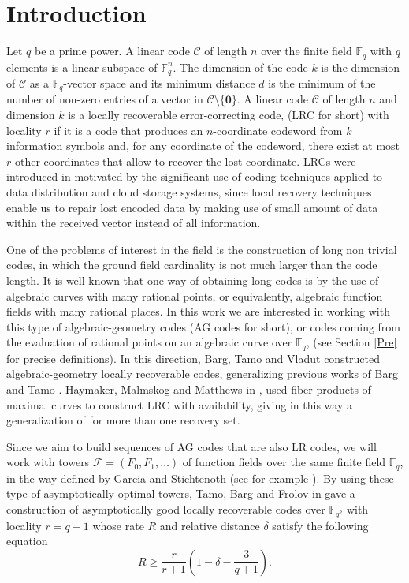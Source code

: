 \documentclass{amsart}
\newcommand{\m}{\mathcal}
\newcommand{\F}{\mathbb{F}}
\theoremstyle{definition}
\begin{document}
\section{Introduction}

 Let $q$ be a prime power.  A linear code $\m{C}$ of length $n$ over the finite field  $\F_q$ with $q$ elements is a linear subspace of $\F_q^n$. The dimension of the code $k$ is the dimension of $\m{C}$ as a $\F_q$-vector space and its minimum distance $d$ is the minimum of the number of non-zero entries of a vector in $\m{C}\setminus\{\mathbf 0\}$. A linear code $\m{C}$ of length $n$ and dimension $k$  is a locally recoverable error-correcting code, (LRC for short) with locality $r$ if it is a code that produces an $n$-coordinate codeword from $k$ information symbols and, for any coordinate of the codeword, there exist at most $r$ other coordinates that allow to recover the lost coordinate. LRCs were introduced in \cite{GHSY12} motivated by the significant use of coding techniques applied to data distribution and cloud storage systems, since local recovery techniques enable us to repair lost encoded data by making use of small amount of data within the received vector instead of all information. 

One of the problems of interest in the field is the construction of long non trivial codes, in which the ground field cardinality is not much larger than the code length. It is well known that one way of obtaining long codes is by the use of algebraic curves with many rational points, or equivalently, algebraic function fields with many rational places. In this work we are interested in working with this type of algebraic-geometry codes (AG codes for short), or codes coming from the evaluation of rational points on an algebraic curve over $\F_q$, (see Section \ref{Pre} for precise definitions).  In this direction, Barg, Tamo and Vladut \cite{BargTamoVladut} constructed algebraic-geometry locally recoverable codes, generalizing previous works of Barg and Tamo \cite{TamoBarg, TamoBargOptimal}. Haymaker, Malmskog and Matthews in \cite{HMM}, used fiber products of maximal curves to construct LRC with availability, giving in this way a generalization of \cite{BargTamoVladut} for more than one recovery set. 

Since we aim to build sequences of AG codes that are also LR codes, we will work with towers $\m{F}=(F_0, F_1, \ldots)$ of function fields over the same finite field $\F_q$, in the way defined by Garcia and Stichtenoth (see for example \cite{GS, stichtenoth}). 
By using these type of asymptotically optimal towers, Tamo, Barg and  Frolov in \cite{TBF16} gave a construction of asymptotically good locally recoverable codes over $\F_{q^2}$ with locality $r=q-1$ whose rate $R$ and relative distance $\delta$ satisfy the following equation
\begin{equation}\label{GVthem}
R\geq \frac{r}{r+1}\left(1-\delta-\frac{3}{q+1}\right).\end{equation}
\end{document}

